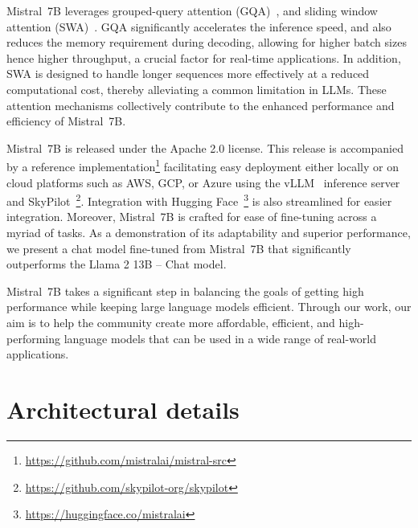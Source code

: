 \documentclass{article}
\def\llama{Llama\xspace}
\def\mistral{Mistral~7B\xspace}
\begin{document}
\mistral leverages grouped-query attention (GQA)~\cite{ainslie2023gqa}, and sliding window attention (SWA)~\cite{child2019generating,beltagy2020longformer}. GQA significantly accelerates the inference speed, and also reduces the memory requirement during decoding, allowing for higher batch sizes hence higher throughput, a crucial factor for real-time applications.
In addition, SWA is designed to handle longer sequences more effectively at a reduced computational cost, thereby alleviating a common limitation in LLMs. These attention mechanisms collectively contribute to the enhanced performance and efficiency of \mistral.

\mistral is released under the Apache 2.0 license.
This release is accompanied by a reference implementation\footnote{\url{https://github.com/mistralai/mistral-src}} facilitating easy deployment either locally or on cloud platforms such as AWS, GCP, or Azure using the vLLM~\cite{kwon2023efficient} inference server and SkyPilot~\footnote{\url{https://github.com/skypilot-org/skypilot}}.
Integration with Hugging Face~\footnote{\url{https://huggingface.co/mistralai}} is also streamlined for easier integration.
Moreover, \mistral is crafted for ease of fine-tuning across a myriad of tasks.
As a demonstration of its adaptability and superior performance, we present a chat model fine-tuned from \mistral that significantly outperforms the \llama 2 13B -- Chat model.

 \mistral takes a significant step in balancing the goals of getting high performance while keeping large language models efficient.
Through our work, our aim is to help the community create more affordable, efficient, and high-performing language models that can be used in a wide range of real-world applications.


\section{Architectural details}
\end{document}
